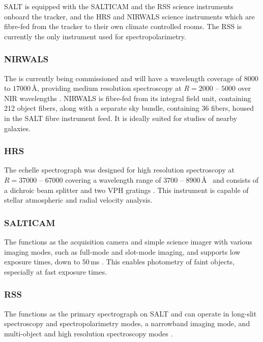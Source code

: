 \gls{SALT} is equipped with the \gls{SALTICAM} and the \gls{RSS} science instruments onboard the tracker, and the \gls{HRS} and \gls{NIRWALS} science instruments which are fibre-fed from the tracker to their own climate controlled rooms.
The \gls{RSS} is currently the only instrument used for spectropolarimetry.

\subsubsection{\gls{NIRWALS}}

The  is currently being commissioned and will have a wavelength coverage of $8000$ to $17000$\,\AA, providing medium resolution spectroscopy at $R = 2000$ -- $5000$ over \gls{NIR} wavelengths \citep{NIRWALS, SALT_NIRWALS}.
\gls{NIRWALS} is fibre-fed from its integral field unit, containing 212 object fibers, along with a separate sky bundle, containing $36$ fibers, housed in the \gls{SALT} fibre instrument feed.
It is ideally suited for studies of nearby galaxies.

\subsubsection{\gls{HRS}}

The  echelle spectrograph was designed for high resolution spectroscopy at $R = 37000$ -- $67000$ covering a wavelength range of $3700$ -- $8900$\,\AA\ \citep{HRS, HRS_init, SALT_HRS} and consists of a dichroic beam splitter and two \gls{VPH} gratings \citep{SALT_hires}.
This instrument is capable of stellar atmospheric and radial velocity analysis.

\subsubsection{\gls{SALTICAM}}

The  functions as the acquisition camera and simple science imager with various imaging modes, such as full-mode and slot-mode imaging, and supports low exposure times, down to $50$\,ms \citep{SALTICAM}.
This enables photometry of faint objects, especially at fast exposure times.

\subsubsection{\gls{RSS}} \label{subsubsec:RSS}

The  functions as the primary spectrograph on \gls{SALT} and can operate in long-slit spectroscopy and spectropolarimetry modes, a narrowband imaging mode, and multi-object and high resolution spectroscopy modes \citep[for an in-depth discussion on operational modes see][]{SALT_operational_modes, SALT_CFP}.

